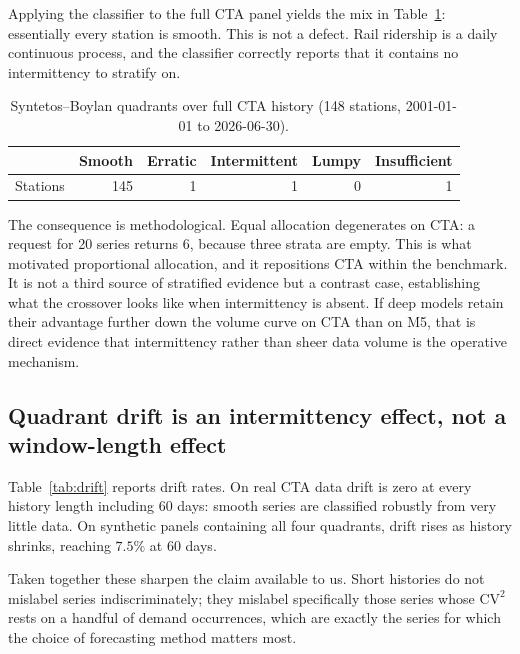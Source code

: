 \documentclass[11pt]{article}
\begin{document}
Applying the classifier to the full CTA panel yields the mix in
Table~\ref{tab:cta-quadrants}: essentially every station is smooth. This is not a
defect. Rail ridership is a daily continuous process, and the classifier
correctly reports that it contains no intermittency to stratify on.

\begin{table}[h]
\centering
\caption{Syntetos--Boylan quadrants over full CTA history (148 stations,
2001-01-01 to 2026-06-30).}
\label{tab:cta-quadrants}
\small
\begin{tabular}{lrrrrr}
\toprule
& Smooth & Erratic & Intermittent & Lumpy & Insufficient \\
\midrule
Stations & 145 & 1 & 1 & 0 & 1 \\
\bottomrule
\end{tabular}
\end{table}

The consequence is methodological. Equal allocation degenerates on CTA: a request
for 20 series returns 6, because three strata are empty. This is what motivated
proportional allocation, and it repositions CTA within the benchmark. It is not a
third source of stratified evidence but a contrast case, establishing what the
crossover looks like when intermittency is absent. If deep models retain their
advantage further down the volume curve on CTA than on M5, that is direct
evidence that intermittency rather than sheer data volume is the operative
mechanism.

\subsection{Quadrant drift is an intermittency effect, not a window-length effect}

Table~\ref{tab:drift} reports drift rates. On real CTA data drift is zero at every
history length including 60 days: smooth series are classified robustly from very
little data. On synthetic panels containing all four quadrants, drift rises as
history shrinks, reaching $7.5\%$ at 60 days.

Taken together these sharpen the claim available to us. Short histories do not
mislabel series indiscriminately; they mislabel specifically those series whose
$\mathrm{CV}^2$ rests on a handful of demand occurrences, which are exactly the
series for which the choice of forecasting method matters most.
\end{document}
